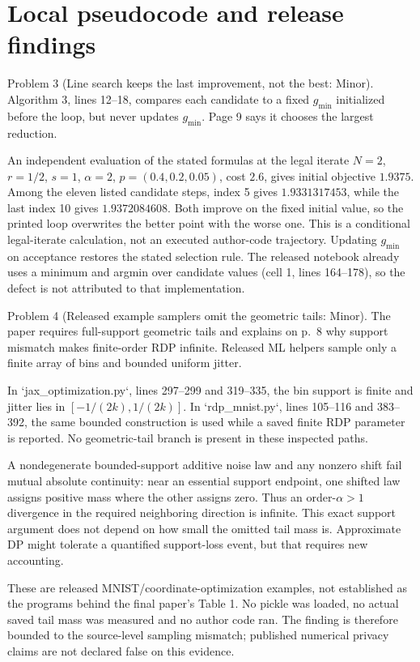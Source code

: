 \documentclass[10pt]{article}
\begin{document}
\section*{Local pseudocode and release findings}
Problem 3 (Line search keeps the last improvement, not the best: Minor).  Algorithm 3, lines 12–18, compares each candidate to a fixed \(g_{\min}\) initialized before the loop, but never updates \(g_{\min}\). Page 9 says it chooses the largest reduction.\par
An independent evaluation of the stated formulas at the legal iterate \(N=2\), \(r=1/2\), \(s=1\), \(\alpha=2\), \(p=(0.4,0.2,0.05)\), cost \(2.6\), gives initial objective \(1.9375\). Among the eleven listed candidate steps, index 5 gives \(1.9331317453\), while the last index 10 gives \(1.9372084608\). Both improve on the fixed initial value, so the printed loop overwrites the better point with the worse one. This is a conditional legal-iterate calculation, not an executed author-code trajectory. Updating \(g_{\min}\) on acceptance restores the stated selection rule. The released notebook already uses a minimum and argmin over candidate values (cell 1, lines 164–178), so the defect is not attributed to that implementation.\par
Problem 4 (Released example samplers omit the geometric tails: Minor).  The paper requires full-support geometric tails and explains on p. 8 why support mismatch makes finite-order RDP infinite. Released ML helpers sample only a finite array of bins and bounded uniform jitter.\par
In `jax\_optimization.py`, lines 297–299 and 319–335, the bin support is finite and jitter lies in \([-1/(2k),1/(2k)]\). In `rdp\_mnist.py`, lines 105–116 and 383–392, the same bounded construction is used while a saved finite RDP parameter is reported. No geometric-tail branch is present in these inspected paths.\par
A nondegenerate bounded-support additive noise law and any nonzero shift fail mutual absolute continuity: near an essential support endpoint, one shifted law assigns positive mass where the other assigns zero. Thus an order-\(\alpha>1\) divergence in the required neighboring direction is infinite. This exact support argument does not depend on how small the omitted tail mass is. Approximate DP might tolerate a quantified support-loss event, but that requires new accounting.\par
These are released MNIST/coordinate-optimization examples, not established as the programs behind the final paper’s Table 1. No pickle was loaded, no actual saved tail mass was measured and no author code ran. The finding is therefore bounded to the source-level sampling mismatch; published numerical privacy claims are not declared false on this evidence.\par
\end{document}
